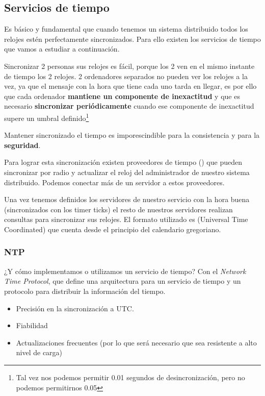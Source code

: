 \subsection{Servicios de tiempo}

Es básico y fundamental que cuando tenemos un sistema distribuido todos los relojes estén perfectamente sincronizados. Para ello existen los servicios de tiempo que vamos a estudiar a continuación.

Sincronizar 2 personas sus relojes es fácil, porque los 2 ven en el mismo instante de tiempo los 2 relojes. 2 ordenadores separados no pueden ver los relojes a la vez, ya que el mensaje con la hora que tiene cada uno tarda en llegar, es por ello que cada ordenador \textbf{mantiene un componente de inexactitud} y que es necesario \textbf{sincronizar periódicamente} cuando ese componente de inexactitud supere un umbral definido\footnote{Tal vez nos podemos permitir 0.01 segundos de desincronización, pero no podemos permitirnos 0.05}

Mantener sincronizado el tiempo es imporescindible para la consistencia y para la \textbf{seguridad}.

Para lograr esta sincronización existen proveedores de tiempo () que pueden sincronizar por radio      y actualizar el reloj del administrador de nuestro sistema distribuido. Podemos conectar más de un servidor a estos proveedores.

Una vez tenemos definidos los servidores de nuestro servicio con la hora buena (sincronizados con los timer ticks) el resto de nuestros servidores realizan consultas para sincronizar sus relojes. El formato utilizado es  (Universal Time Coordinated) que cuenta desde el principio del calendario gregoriano.


\subsubsection{NTP}
¿Y cómo implementamos o utilizamos un servicio de tiempo? Con el  \textit{Network Time Protocol}, que define una arquitectura para un servicio de tiempo y un protocolo para distribuir la información del tiempo.

\begin{itemize}
	\item Precisión en la sincronización a UTC.
	\item Fiabilidad
	\item Actualizaciones frecuentes (por lo que será necesario que sea resistente a alto nivel de carga)
\end{itemize}

